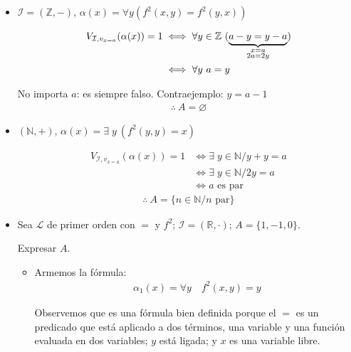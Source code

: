 \begin{itemize}
    \item $\mathcal{I} = (\mathbb{Z}, -)$,
        $\alpha(x) = \forall y (f^2(x,y) = f^2(y,x))$

        \begin{align*}
            V_{\mathcal{I}, v_{x = a}}(\alpha(x)) = 1 
            &\iff
            \forall y \in \mathbb{Z} ~ (\underbrace{a - y = y - a}_{%
            \substack{x = a\\ 2a = 2y}}) \\
            &\iff \forall y ~ a = y
        \end{align*}

        No importa $a$: es siempre falso. Contraejemplo: $y = a - 1$
        \begin{gather*}
            \therefore ~ A = \varnothing
        \end{gather*}

    \item $\left(\mathbb{N}, +\right)$,
        $\alpha(x) = \exists \; y ~ (f^2(y,y) = x)$

        \begin{align*}
            V_{\mathcal{I}, v_{x=a}}(\alpha(x)) = 1
            &\iff \exists \; y \in \mathbb{N} / y + y = a\\
            &\iff \exists \; y \in \mathbb{N} / 2 y = a \\
            &\iff a \text{ es par}
        \end{align*}
        \begin{gather*}
            \therefore ~ A = \{ n \in \mathbb{N} / n \text{ par} \}
        \end{gather*}

    \item Sea $\mathcal{L}$ de primer orden con $=$ y $f^2$; 
        $\mathcal{I}=(\mathbb{R}, \cdot)$; $A = \{ 1, -1, 0 \}$.

        Expresar $A$.

        \begin{itemize}
        \item Armemos la fórmula:
        \begin{gather*}
            \alpha_1(x) = \forall y \quad f^2(x,y) = y
        \end{gather*}

        Observemos que es una fórmula bien definida porque el $=$ es un 
        predicado que está aplicado a dos términos, una variable y una 
        función evaluada en dos variables; $y$ está ligada; y $x$ es 
        una variable libre.


\end{itemize}
\end{itemize}
